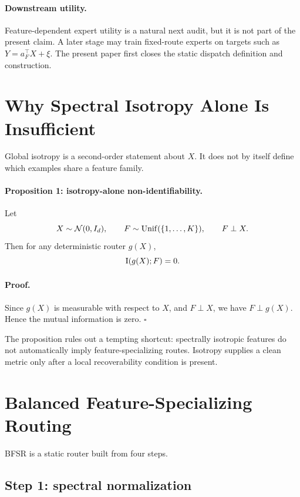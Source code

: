 \documentclass{article}
\begin{document}
\paragraph{Downstream utility.}
Feature-dependent expert utility is a natural next audit, but it is not part of
the present claim.  A later stage may train fixed-route experts on targets such
as \(Y=a_F^\top X+\xi\).  The present paper first closes the static dispatch
definition and construction.

\section{Why Spectral Isotropy Alone Is Insufficient}

Global isotropy is a second-order statement about \(X\).  It does not by itself
define which examples share a feature family.

\paragraph{Proposition 1: isotropy-alone non-identifiability.}
Let
\[
    X\sim\mathcal{N}(0,I_d),\qquad
    F\sim\mathrm{Unif}(\{1,\ldots,K\}),\qquad
    F\perp X.
\]
Then for any deterministic router \(g(X)\),
\begin{equation}
    \mathrm{I}(g(X);F)=0.
\end{equation}

\paragraph{Proof.}
Since \(g(X)\) is measurable with respect to \(X\), and \(F\perp X\), we have
\(F\perp g(X)\).  Hence the mutual information is zero.
\hfill\(\square\)

The proposition rules out a tempting shortcut: spectrally isotropic features do
not automatically imply feature-specializing routes.  Isotropy supplies a clean
metric only after a local recoverability condition is present.

\section{Balanced Feature-Specializing Routing}

BFSR is a static router built from four steps.

\subsection{Step 1: spectral normalization}
\end{document}
